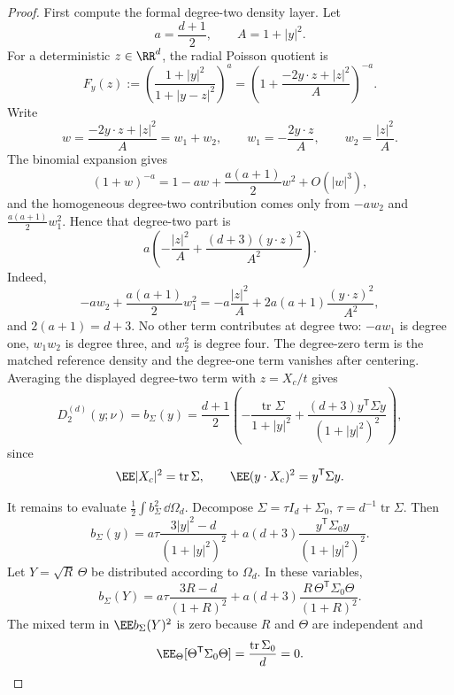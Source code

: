 \begin{proof}
First compute the formal degree-two density layer.  Let
\[
  a=\frac{d+1}{2},\qquad A=1+|y|^2 .
\]
For a deterministic \(z\in\RR^d\), the radial Poisson quotient is
\[
F_y(z):=
\left(\frac{1+|y|^2}{1+|y-z|^2}\right)^a
=
\left(1+\frac{-2y\cdot z+|z|^2}{A}\right)^{-a}.
\]
Write
\[
  w=\frac{-2y\cdot z+|z|^2}{A}=w_1+w_2,\qquad
  w_1=-\frac{2y\cdot z}{A},\qquad
  w_2=\frac{|z|^2}{A}.
\]
The binomial expansion gives
\[
  (1+w)^{-a}=1-aw+\frac{a(a+1)}2w^2+O(|w|^3),
\]
and the homogeneous degree-two contribution comes only from \(-aw_2\) and
\(\frac{a(a+1)}2w_1^2\).  Hence that degree-two part is
\[
a\left(-\frac{|z|^2}{A}
+\frac{(d+3)(y\cdot z)^2}{A^2}\right).
\]
Indeed,
\[
  -aw_2+\frac{a(a+1)}2w_1^2
  =
  -a\frac{|z|^2}{A}
  +2a(a+1)\frac{(y\cdot z)^2}{A^2},
\]
and \(2(a+1)=d+3\).  No other term contributes at degree two:
\(-aw_1\) is degree one, \(w_1w_2\) is degree three, and \(w_2^2\) is degree
four.  The degree-zero term is the matched reference density and the
degree-one term vanishes after centering.  Averaging the displayed
degree-two term with \(z=X_c/t\) gives
\[
  D_2^{(d)}(y;\nu)=b_\Sigma(y)=
  \frac{d+1}{2}\left(
  -\frac{\operatorname{tr}\Sigma}{1+|y|^2}
  +\frac{(d+3)y^{\mathsf T}\Sigma y}{(1+|y|^2)^2}
  \right),
\]
since
\[
\EE |X_c|^2=\operatorname{tr}\Sigma,\qquad
\EE (y\cdot X_c)^2=y^{\mathsf T}\Sigma y .
\]

It remains to evaluate \(\frac12\int b_\Sigma^2\,\dd\Omega_d\).  Decompose
\(\Sigma=\tau I_d+\Sigma_0\), \(\tau=d^{-1}\operatorname{tr}\Sigma\).  Then
\[
b_\Sigma(y)=
a\tau\frac{3|y|^2-d}{(1+|y|^2)^2}
+a(d+3)\frac{y^{\mathsf T}\Sigma_0y}{(1+|y|^2)^2}.
\]
Let \(Y=\sqrt R\,\Theta\) be distributed according to \(\Omega_d\).  In these
variables,
\[
b_\Sigma(Y)=
a\tau\frac{3R-d}{(1+R)^2}
+a(d+3)\frac{R\,\Theta^{\mathsf T}\Sigma_0\Theta}{(1+R)^2}.
\]
The mixed term in \(\EE b_\Sigma(Y)^2\) is zero because \(R\) and \(\Theta\)
are independent and
\[
\EE_\Theta[\Theta^{\mathsf T}\Sigma_0\Theta]
=\frac{\operatorname{tr}\Sigma_0}{d}=0 .
\]


\end{proof}
